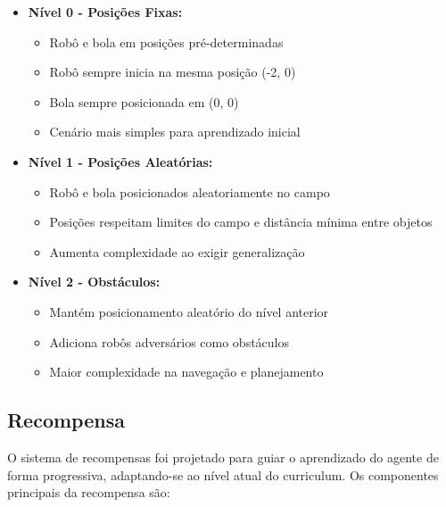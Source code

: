 \begin{itemize}
    \item \textbf{Nível 0 - Posições Fixas:}
    \begin{itemize}
        \item Robô e bola em posições pré-determinadas
        \item Robô sempre inicia na mesma posição (-2, 0)
        \item Bola sempre posicionada em (0, 0)
        \item Cenário mais simples para aprendizado inicial
    \end{itemize}

    \item \textbf{Nível 1 - Posições Aleatórias:}
    \begin{itemize}
        \item Robô e bola posicionados aleatoriamente no campo
        \item Posições respeitam limites do campo e distância mínima entre objetos
        \item Aumenta complexidade ao exigir generalização
    \end{itemize}

    \item \textbf{Nível 2 - Obstáculos:}
    \begin{itemize}
        \item Mantém posicionamento aleatório do nível anterior
        \item Adiciona robôs adversários como obstáculos
        \item Maior complexidade na navegação e planejamento
    \end{itemize}
\end{itemize}

\subsection{Recompensa}
O sistema de recompensas foi projetado para guiar o aprendizado do agente de forma progressiva, adaptando-se ao nível atual do curriculum. Os componentes principais da recompensa são:


